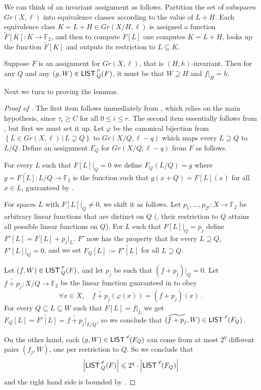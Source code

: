 \documentclass{toc}
\newcommand\card[1]{\left| {#1} \right|}
\newcommand\Set[2]{ \left\{ #1 \,  \vert  \, #2\right\} }
\renewcommand\ge{\geqslant}
\renewcommand\le{\leqslant}
\renewcommand\subset{\subseteq}
\renewcommand\supset{\supseteq}
\def\M{{\sf LIST\,}}
\def\F{\mathbb{F}}
\begin{document}
We can think of an invariant assignment as follows. Partition the set of subspaces  $Gr(X,\ell)$ into equivalence classes according to the value of $L+H$. Each equivalence class $K = L+H\in Gr(X/H,\ell)$ is assigned a function $\tilde F[K]:K\to\F_2$, and then to compute $F[L]$ one computes $K = L+H$, looks up the function $\tilde F[K]$ and outputs its restriction to $L\subset K$.

\begin{lemma}\label{lemma:test-side}
Suppose $F$ is an assignment for $Gr(X,\ell)$, that is $(H,h)$-invariant. Then for any $Q$ and any $(g,W)\in \M_Q^{\vec\tau}(F)$, it must be that $W\supset H$ and  $f|_{H} = h$.
\end{lemma}
%

Next we turn to proving the lemmas.
\begin{proof}[Proof of ]
%
The first item follows immediately from , which relies on the main hypothesis, since $\tau_i\ge C$ for all $0\le i\le r$.
%
The second item essentially follows from , but first we must set it up.
%
Let  $\varphi$ be the canonical bijection from $\Set{L\in Gr(X,\ell)}{L\supset Q}$ to $Gr(X/Q,\ell-q)$ which maps every $L\supset Q$ to $L/Q$. Define an assignment $F_{Q}$ for $Gr(X/Q,\ell-q)$ from $F$ as follows.

For every $L$ such that $F[L]|_Q=0$ we define $F_Q(L/Q) = g$ where $g=\widetilde{F[L]}:L/Q\to\F_2$ is the function such that  $g(x+Q) = F[L](x)$ for all $x\in L$, guaranteed by .

For spaces $L$ with $F[L]|_Q \neq 0$, we shift it as follows. Let $p_1,\ldots,p_{2^q}:X\to \F_2$ be arbitrary linear functions that are distinct on $Q$ (\ie, their restriction to $Q$ attains all possible linear functions on $Q$). For $L$ such that $F[L]|_Q = p_j$ define $F'[L] = F[L] + p_j|_L$. $F'$ now has the property  that for every $L\supset Q$, $F'[L]|_Q=0$, and we set $F_Q[L] := \widetilde{F'[L]}$ for all $L\supset Q$.

Let $(f,W) \in \M^{\vec\tau}_Q(F)$, and let $p_j$ be such that $(f+p_j)|_Q=0$. Let $\widetilde{f+p_j}: X/Q\to\F_2$ be the linear function guaranteed in  to obey
%
\[ \forall x\in X,\quad \widetilde{f+p_j}(\varphi(x)) = (f+p_j)(x)\,.
\]
%
For every $Q\subset L\subset W$ such that $F[L] = f|_L$ we get  $F_Q[L] = \widetilde{F'[L]} = \widetilde{f+p_j}|_{L/Q}$, so we conclude that $(\widetilde{f+p_j},W)\in \M^{\vec\tau}(F_Q)$.

On the other hand, each $(g,W)\in \M^{\vec\tau}(F_Q)$ can come from at most $2^q$ different pairs $(f_j,W)$, one per restriction to $Q$. So we conclude that
\[ \card{\M^{\vec\tau}_Q(F)} \le 2^q \cdot \card{\M^{\vec\tau}(F_Q)}
\] and the right hand side is bounded by .
\end{proof}
%
\end{document}
